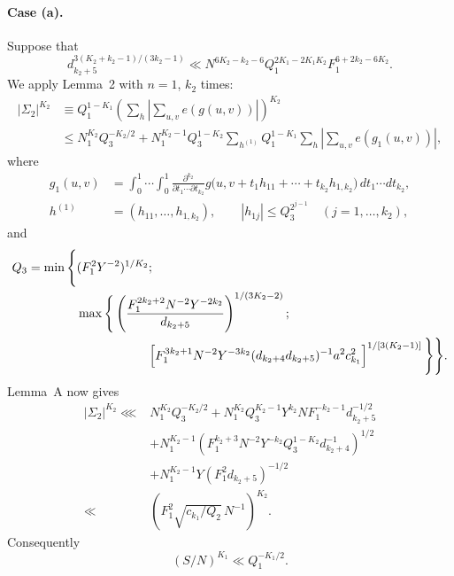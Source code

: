 \documentclass[10pt]{article}
\begin{document}
\paragraph{Case (a).}
Suppose that
\begin{equation}
  d_{k_2+5}^{3(K_2+k_2-1)/(3k_2-1)}
  \ll N^{6K_2-k_2-6}Q_1^{2K_1-2K_1K_2}F_1^{6+2k_2-6K_2}.
  \tag{a}
\end{equation}
We apply Lemma~2 with $n=1$, $k_2$ times:
\[
\begin{aligned}
  |\Sigma_2|^{K_2}
  &\equiv Q_1^{1-K_1}
    \left(\sum_h\left|\sum_{u,v}e(g(u,v))\right|\right)^{K_2}\\
  &\leqslant N_1^{K_2}Q_3^{-K_2/2}
   +N_1^{K_2-1}Q_3^{1-K_2}
    \sum_{h^{(1)}}Q_1^{1-K_1}\sum_h
      \left|\sum_{u,v}e(g_1(u,v))\right|,
\end{aligned}
\]
where
\[
\begin{aligned}
  g_1(u,v)
  &=\int_0^1\!\cdots\!\int_0^1
    \frac{\partial^{k_2}}{\partial t_1\cdots\partial t_{k_2}}
    g\bigl(u,v+t_1h_{11}+\cdots+t_{k_2}h_{1,k_2}\bigr)
    \,dt_1\cdots dt_{k_2},\\
  h^{(1)}&=(h_{11},\ldots,h_{1,k_2}),
  \qquad |h_{1j}|\leqslant Q_3^{2^{j-1}}
  \quad(j=1,\ldots,k_2),
\end{aligned}
\]
and
\[
\begin{aligned}
  Q_3=\min\Bigg\{&(F_1^2Y^{-2})^{1/K_2};\\
  &\max\Bigg\{
    \left(\frac{F_1^{2k_2+2}N^{-2}Y^{-2k_2}}{d_{k_2+5}}\right)^{1/(3K_2-2)};\\
  &\hspace{20mm}
    \left[
      F_1^{3k_2+1}N^{-2}Y^{-3k_2}
      (d_{k_2+4}d_{k_2+5})^{-1}a^2c_{k_1}^2
    \right]^{1/[3(K_2-1)]}
  \Bigg\}\Bigg\}.
\end{aligned}
\]
Lemma~A now gives
\[
\begin{aligned}
  |\Sigma_2|^{K_2}
  \lll{}&N_1^{K_2}Q_3^{-K_2/2}
  +N_1^{K_2}Q_3^{K_2-1}Y^{k_2}NF_1^{-k_2-1}d_{k_2+5}^{-1/2}\\
  &+N_1^{K_2-1}
    \left(F_1^{k_2+3}N^{-2}Y^{-k_2}Q_3^{1-K_2}d_{k_2+4}^{-1}\right)^{1/2}\\
  &+N_1^{K_2-1}Y(F_1^2d_{k_2+5})^{-1/2}\\
  \ll{}&\left(F_1^2\sqrt{c_{k_1}/Q_2}\,N^{-1}\right)^{K_2}.
\end{aligned}
\]
Consequently
\[
  (S/N)^{K_1}\ll Q_1^{-K_1/2}.
\]
\end{document}
